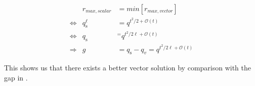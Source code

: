 \begin{eqnarray}
 & r_{max,scalar} & =min\left[r_{max,vector}\right]\nonumber \\
\Leftrightarrow & q_{\mathrm{s}}^{\ell} & =q^{t^{2}/2+\mathcal{O}(t)}\nonumber \\
\Leftrightarrow & q_{\mathrm{s}} & ^{=}q^{t^{2}/2\ell+\mathcal{O}(t)}\nonumber \\
\Rightarrow & g & =q_{\mathrm{s}}-q_{v}=q^{t^{2}/2\ell+\mathcal{O}(t)}\label{eq:gap_e1l2}
\end{eqnarray}

This shows us that there exists a better vector solution by comparison
with the gap in \cite[Fig. 4]{Wachter-Zeh:2018}.

\clearpage